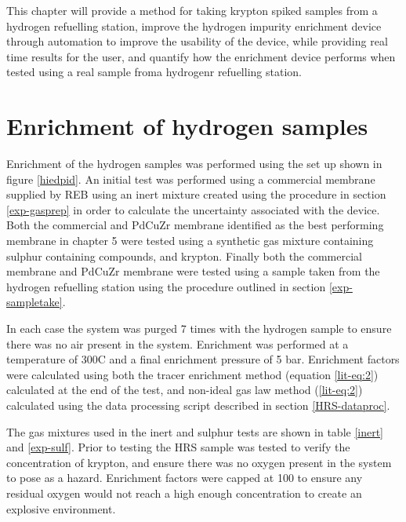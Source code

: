 This chapter will provide a method for taking krypton spiked samples from a hydrogen refuelling station, improve the hydrogen impurity enrichment device through automation to improve the usability of the device, while providing real time results for the user, and quantify how the enrichment device performs when tested using a real sample froma  hydrogenr refuelling station. 

\section{Enrichment of hydrogen samples}
Enrichment of the hydrogen samples was performed using the set up shown in figure \ref{hiedpid}. An initial test was performed using a commercial membrane supplied by REB using an inert mixture created using the procedure in section \ref{exp-gasprep} in order to calculate the uncertainty associated with the device. Both the commercial and PdCuZr membrane identified as the best performing membrane in chapter 5 were tested using a synthetic gas mixture containing sulphur containing compounds, and krypton. Finally both the commercial membrane and PdCuZr membrane were tested using a sample taken from the hydrogen refuelling station using the procedure outlined in section \ref{exp-sampletake}.

In each case the system was purged 7 times with the hydrogen sample to ensure there was no air present in the system. Enrichment was performed at a temperature of 300\textdegree C and a final enrichment pressure of 5 bar. Enrichment factors were calculated using both the tracer enrichment method (equation \ref{lit-eq:2}) calculated at the end of the test, and non-ideal gas law method (\ref{lit-eq:2}) calculated using the data processing script described in section \ref{HRS-dataproc}.

The gas mixtures used in the inert and sulphur tests are shown in table \ref{inert} and \ref{exp-sulf}. Prior to testing the HRS sample was tested to verify the concentration of krypton, and ensure there was no oxygen present in the system to pose as a hazard. Enrichment factors were capped at 100 to ensure any residual oxygen would not reach a high enough concentration to create an explosive environment.

